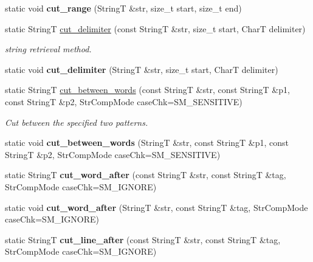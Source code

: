 \begin{CompactItemize}
\item 
\hypertarget{classAlgorithm_57600dafff96cfd5475f19cb12a94466}{
static void \textbf{cut\_\-range} (StringT \&str, size\_\-t start, size\_\-t end)}
\label{classAlgorithm_57600dafff96cfd5475f19cb12a94466}

\item 
static StringT \hyperlink{classAlgorithm_70e04500b28f3c0b0b8cc75532aa4eee}{cut\_\-delimiter} (const StringT \&str, size\_\-t start, CharT delimiter)
\begin{CompactList}\small\item\em string retrieval method. \item\end{CompactList}\item 
\hypertarget{classAlgorithm_8a5671eea2d1c824a20804ef9ae81d0d}{
static void \textbf{cut\_\-delimiter} (StringT \&str, size\_\-t start, CharT delimiter)}
\label{classAlgorithm_8a5671eea2d1c824a20804ef9ae81d0d}

\item 
static StringT \hyperlink{classAlgorithm_5e4035b8afe3b04f371314b4e6840798}{cut\_\-between\_\-words} (const StringT \&str, const StringT \&p1, const StringT \&p2, StrCompMode caseChk=SM\_\-SENSITIVE)
\begin{CompactList}\small\item\em Cut between the specified two patterns. \item\end{CompactList}\item 
\hypertarget{classAlgorithm_f2bb23f6875f069568da85e78062296c}{
static void \textbf{cut\_\-between\_\-words} (StringT \&str, const StringT \&p1, const StringT \&p2, StrCompMode caseChk=SM\_\-SENSITIVE)}
\label{classAlgorithm_f2bb23f6875f069568da85e78062296c}

\item 
\hypertarget{classAlgorithm_0838d9b4f348935e22b12563f0b32176}{
static StringT \textbf{cut\_\-word\_\-after} (const StringT \&str, const StringT \&tag, StrCompMode caseChk=SM\_\-IGNORE)}
\label{classAlgorithm_0838d9b4f348935e22b12563f0b32176}

\item 
\hypertarget{classAlgorithm_4ec6d907ba268d826af8aaeba026c914}{
static void \textbf{cut\_\-word\_\-after} (StringT \&str, const StringT \&tag, StrCompMode caseChk=SM\_\-IGNORE)}
\label{classAlgorithm_4ec6d907ba268d826af8aaeba026c914}

\item 
\hypertarget{classAlgorithm_a054d95e87397ed7023256ec1e766e4a}{
static StringT \textbf{cut\_\-line\_\-after} (const StringT \&str, const StringT \&tag, StrCompMode caseChk=SM\_\-IGNORE)}
\label{classAlgorithm_a054d95e87397ed7023256ec1e766e4a}


\end{CompactItemize}

